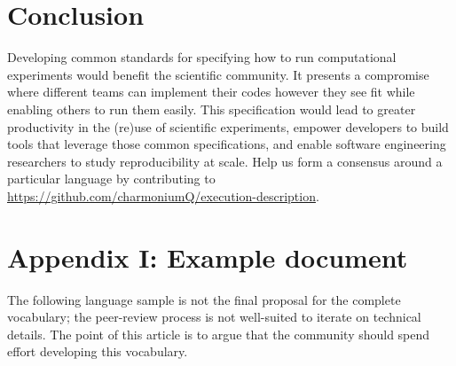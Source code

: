 \documentclass[manuscript,authordraft]{acmart}
\begin{document}
\hypertarget{conclusion}{%
\section{Conclusion}\label{conclusion}}

Developing common standards for specifying how to run computational
experiments would benefit the scientific community. It presents a
compromise where different teams can implement their codes however they
see fit while enabling others to run them easily. This specification
would lead to greater productivity in the (re)use of scientific
experiments, empower developers to build tools that leverage those
common specifications, and enable software engineering researchers to
study reproducibility at scale. Help us form a consensus around a
particular language by contributing to
\url{https://github.com/charmoniumQ/execution-description}.

\hypertarget{appendix-i-example-document}{%
\section{Appendix I: Example
document}\label{appendix-i-example-document}}

The following language sample is not the final proposal for the complete
vocabulary; the peer-review process is not well-suited to iterate on
technical details. The point of this article is to argue that the
community should spend effort developing this vocabulary.

\small
\end{document}
